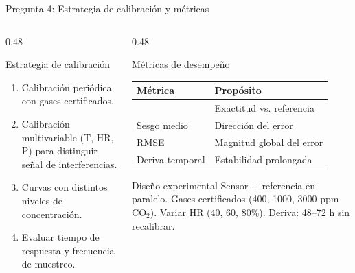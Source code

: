 \documentclass[aspectratio=169, 11pt]{beamer}
\newcommand{\MAPE}{\text{MAPE}}
\begin{document}
\begin{frame}{Pregunta 4: Estrategia de calibración y métricas}
\begin{columns}[T]
\begin{column}{0.48\textwidth}
\begin{exampleblock}{Estrategia de calibración}
\footnotesize
\begin{enumerate}
    \item Calibración periódica con gases certificados.
    \item Calibración multivariable (T, HR, P) para distinguir señal de interferencias.
    \item Curvas con distintos niveles de concentración.
    \item Evaluar tiempo de respuesta y frecuencia de muestreo.
\end{enumerate}
\end{exampleblock}
\end{column}
\begin{column}{0.48\textwidth}
\begin{block}{Métricas de desempeño}
\footnotesize
\centering
\begin{tabular}{@{}ll@{}}
\toprule
Métrica & Propósito \\
\midrule
\MAPE & Exactitud vs. referencia \\
Sesgo medio & Dirección del error \\
RMSE & Magnitud global del error \\
Deriva temporal & Estabilidad prolongada \\
\bottomrule
\end{tabular}
\end{block}
\begin{exampleblock}{Diseño experimental}
\footnotesize
Sensor + referencia en paralelo. Gases certificados (400, 1000, 3000 ppm CO$_2$). Variar HR (40, 60, 80\%). Deriva: 48--72 h sin recalibrar.
\end{exampleblock}
\end{column}
\end{columns}
\end{frame}
\end{document}
